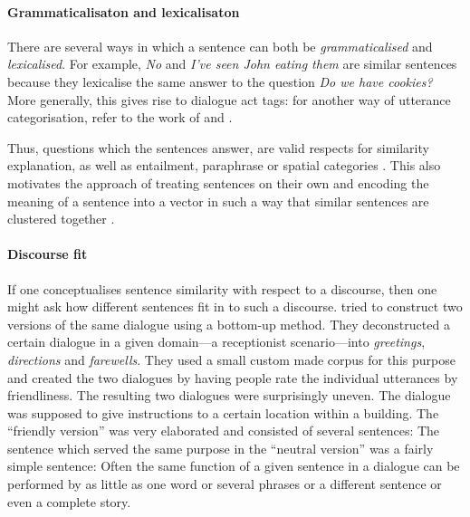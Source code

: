 \documentclass[11pt]{article}
\begin{document}
\paragraph{Grammaticalisaton and lexicalisaton}

There are several ways in which a sentence can both be \emph{grammaticalised} and \emph{lexicalised}. For example, \textit{No} and \textit{I've seen John eating them} are similar sentences because they lexicalise the same answer to the question \textit{Do we have cookies?} More generally, this gives rise to dialogue act tags: for another way of utterance categorisation, refer to the work of  and .

Thus, questions which the sentences answer, are valid respects for similarity explanation, as well as entailment, paraphrase \cite{White:2015:WSE:2838931.2838932} or spatial categories \cite{ritter-EtAl:2015:*SEM2015}. This also motivates the approach of treating sentences on their own and encoding the meaning of a sentence into a vector in such a way that similar sentences are clustered together \cite{DBLP:journals/corr/abs-1003-4394,baroni2014frege,Socher:2012:SCT:2390948.2391084,wieting2015paraphrase,DBLP:journals/corr/HillCK16}.

\paragraph{Discourse fit}

If one conceptualises sentence similarity with respect to a discourse, then one might ask how different sentences fit in to such a discourse.  tried to construct two versions of the same dialogue using a bottom-up method. They deconstructed a certain dialogue in a given domain---a receptionist scenario---into \textit{greetings}, \textit{directions} and \textit{farewells}. They used a small custom made corpus for this purpose and created the two dialogues by having people rate the individual utterances by friendliness. The resulting two dialogues were surprisingly uneven. The dialogue was supposed to give instructions to a certain location within a building. The ``friendly version'' was very elaborated and consisted of several sentences:
The sentence which served the same purpose in the ``neutral version'' was a fairly simple sentence:
Often the same function of a given sentence in a dialogue can be performed by as little as one word or several phrases or a different sentence or even a complete story. 
\end{document}

